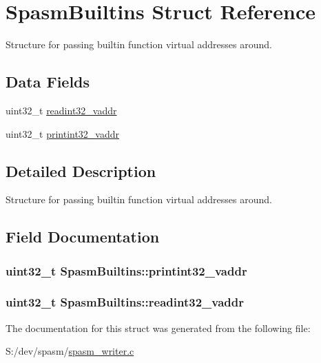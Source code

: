 \hypertarget{struct_spasm_builtins}{
\section{\-Spasm\-Builtins \-Struct \-Reference}
\label{struct_spasm_builtins}
}


\-Structure for passing builtin function virtual addresses around.  


\subsection*{\-Data \-Fields}
\begin{DoxyCompactItemize}
\item 
uint32\-\_\-t \hyperlink{struct_spasm_builtins_abe2b88179df728602a42a572bbbf68bb}{readint32\-\_\-vaddr}
\item 
uint32\-\_\-t \hyperlink{struct_spasm_builtins_aa5ea119e376ce7ab645eb1549e8c2533}{printint32\-\_\-vaddr}
\end{DoxyCompactItemize}


\subsection{\-Detailed \-Description}
\-Structure for passing builtin function virtual addresses around. 

\subsection{\-Field \-Documentation}
\hypertarget{struct_spasm_builtins_aa5ea119e376ce7ab645eb1549e8c2533}{
\subsubsection[{printint32\-\_\-vaddr}]{\setlength{\rightskip}{0pt plus 5cm}uint32\-\_\-t {\bf \-Spasm\-Builtins\-::printint32\-\_\-vaddr}}}
\label{struct_spasm_builtins_aa5ea119e376ce7ab645eb1549e8c2533}
\hypertarget{struct_spasm_builtins_abe2b88179df728602a42a572bbbf68bb}{
\subsubsection[{readint32\-\_\-vaddr}]{\setlength{\rightskip}{0pt plus 5cm}uint32\-\_\-t {\bf \-Spasm\-Builtins\-::readint32\-\_\-vaddr}}}
\label{struct_spasm_builtins_abe2b88179df728602a42a572bbbf68bb}


\-The documentation for this struct was generated from the following file\-:\begin{DoxyCompactItemize}
\item 
\-S\-:/dev/spasm/\hyperlink{spasm__writer_8c}{spasm\-\_\-writer.\-c}\end{DoxyCompactItemize}
